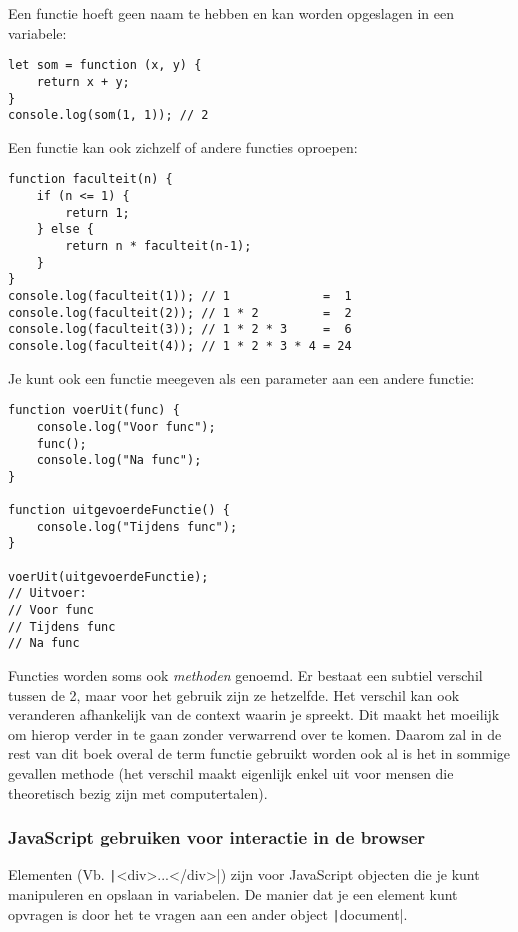 Een functie hoeft geen naam te hebben en kan worden opgeslagen in een variabele:
\begin{verbatim}
let som = function (x, y) {
    return x + y;
}
console.log(som(1, 1)); // 2
\end{verbatim}

Een functie kan ook zichzelf of andere functies oproepen:
\begin{verbatim}
function faculteit(n) {
    if (n <= 1) {
        return 1;
    } else {
        return n * faculteit(n-1);
    }
}
console.log(faculteit(1)); // 1             =  1
console.log(faculteit(2)); // 1 * 2         =  2
console.log(faculteit(3)); // 1 * 2 * 3     =  6
console.log(faculteit(4)); // 1 * 2 * 3 * 4 = 24
\end{verbatim}

Je kunt ook een functie meegeven als een parameter aan een andere functie:
\begin{verbatim}
function voerUit(func) {
    console.log("Voor func");
    func();
    console.log("Na func");
}

function uitgevoerdeFunctie() {
    console.log("Tijdens func");
}

voerUit(uitgevoerdeFunctie);
// Uitvoer:
// Voor func
// Tijdens func
// Na func
\end{verbatim}

\Opm Functies worden soms ook \emph{methoden} genoemd. Er bestaat een subtiel 
verschil tussen de 2, maar voor het gebruik zijn ze hetzelfde. Het verschil 
kan ook veranderen afhankelijk van de context waarin je spreekt. Dit maakt het
moeilijk om hierop verder in te gaan zonder verwarrend over te komen. Daarom 
zal in de rest van dit boek overal de term functie gebruikt worden ook al is
het in sommige gevallen methode (het verschil maakt eigenlijk enkel uit voor
mensen die theoretisch bezig zijn met computertalen).

\subsubsection{JavaScript gebruiken voor interactie in de browser}%
\label{ssub:JavaScript gebruiken voor interactie in de browser}

Elementen (Vb. \texttt|<div>...</div>|) zijn voor JavaScript objecten
die je kunt manipuleren en opslaan in variabelen. De manier dat je een element 
kunt opvragen is door het te vragen aan een ander object
\texttt|document|.

